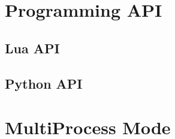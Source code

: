 \documentclass[10pt,a4paper]{article}
\begin{document}
\begin{CJK}{UTF8}{gbsn}
  \section{Programming API}
  \subsection{Lua API}
  \subsection{Python API}
  \section{MultiProcess Mode}

\newpage
\end{CJK}
\end{document}
